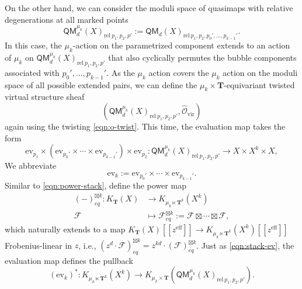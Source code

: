 \documentclass[reqno]{amsart}
\numberwithin{equation}{section}
\numberwithin{equation}{section}
\numberwithin{equation}{section}
\theoremstyle{definition}
\theoremstyle{remark}
\theoremstyle{remark}
\begin{document}
On the other hand, we can consider the moduli space of quasimaps with relative degenerations at all marked points
\begin{equation}
    \mathsf{QM}_d^{\mu_k}(X)_{\mathrm{rel} \  p_1,p_2, p'} := \mathsf{QM}_d(X)_{\mathrm{rel} \  p_1,p_2, p_0', \dots, p_{k-1}'}.
\end{equation}
In this case, the $\mu_k$-action on the parametrized component extends to an action of $\mu_k$ on $\mathsf{QM}_d^{\mu_k}(X)_{\mathrm{rel} \  p_1,p_2, p'}$ that also cyclically permutes the bubble components associated with $p_0', \dots, p_{k-1}'$. As the $\mu_k$ action covers the $\mu_k$ action on the moduli space of all possible extended pairs, we can define the $\mu_k \times \mathbf{T}$-equivariant twisted virtual structure sheaf 
\begin{equation}
    (\mathsf{QM}_d^{\mu_k}(X)_{\mathrm{rel} \  p_1,p_2, p'}, \hat{\mathcal{O}}_{\mathrm{vir}})
\end{equation}
again using the twisting \eqref{eqn:o-twist}. This time, the evaluation map takes the form
\begin{equation}
    \mathrm{ev}_{p_1} \times (\mathrm{ev}_{p_0'} \times \cdots \times \mathrm{ev}_{p_{k-1}'}) \times \mathrm{ev}_{p_2}: \mathsf{QM}_d^{\mu_k}(X)_{\mathrm{rel} \  p_1,p_2, p'} \to X \times X^k \times X,
\end{equation}
We abbreviate
\begin{equation}
    \mathrm{ev}_k := \mathrm{ev}_{p_0'} \times \cdots \times \mathrm{ev}_{p_{k-1}'}.
\end{equation}
Similar to \eqref{eqn:power-stack}, define the power map
\begin{equation}
    \begin{aligned}
    (-)^{\boxtimes k}_{eq} : K_\mathbf{T}(X) &\to K_{\mu_k \ltimes \mathbf{T}^k}(X^k) \\
     \mathcal{F} & \mapsto \mathcal{F}^{\boxtimes k}_{eq} := \mathcal{F} \boxtimes \cdots \boxtimes \mathcal{F},
    \end{aligned}
\end{equation}
which naturally extends to a map $K_\mathbf{T}(X)[\![ z^{\mathrm{eff}} ]\!] \to K_{\mu_k \ltimes \mathbf{T}^k}(X^k)[\![ z^{\mathrm{eff}} ]\!]$ Frobenius-linear in $z$, i.e., $(z^d \cdot\mathcal{F})^{\boxtimes k}_{eq} = z^{kd} \cdot (\mathcal{F})^{\boxtimes k}_{eq}$. Just as \eqref{eqn:stack-ev}, the evaluation map defines the pullback
\begin{equation}
    (\mathrm{ev}_k)^*: K_{\mu_k \ltimes \mathbf{T}^k}(X^k) \to K_{\mu_k \times \mathbf{T}} (\mathsf{QM}_d^{\mu_k}(X)_{\mathrm{rel} \  p_1,p_2, p'}).
\end{equation}
\end{document}
